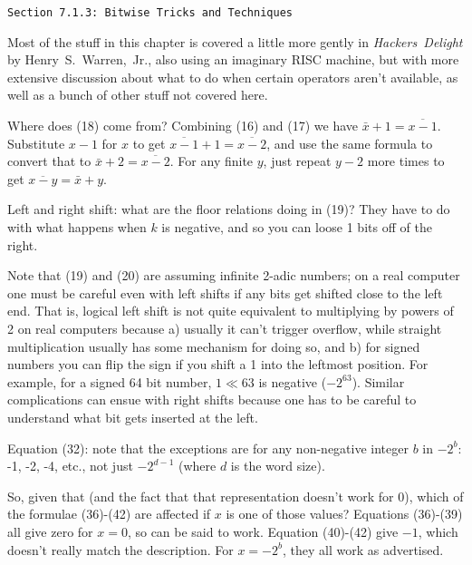 \vfil\break

\vskip 0.3in
\centerline{\tt Section 7.1.3: Bitwise Tricks and Techniques}
\vskip0.2in

Most of the stuff in this chapter is covered a little more gently
in {\it Hackers~Delight} by Henry~S.~Warren,~Jr., also using an imaginary RISC machine,
but with more extensive discussion about what to do when certain
operators aren't available, as well as a bunch of other stuff not
covered here.

\vskip 0.1in 

\noindent [p 135] Where does (18) come from? \hfil\break Combining (16) and
(17) we have $\bar x + 1 = \overline{x - 1}$.  Substitute $x-1$ for $x$
to get $\overline{x - 1} + 1 = \overline{x - 2}$, and use the same
formula to convert that to $\bar x + 2 = \overline{x - 2}$.  For any
finite $y$, just repeat $y-2$ more times to get $\overline{x - y} = \bar x + y$.

\vskip 0.08in \noindent [p 135] Left and right shift: what are the floor
relations doing in (19)?  \hfil\break They have to do with what happens when $k$
is negative, and so you can loose 1 bits off of the right.

Note that (19) and (20) are assuming infinite 2-adic numbers; on a real
computer one must be careful even with left shifts if any bits get shifted
close to the left end.  That is, logical left shift is not quite equivalent
to multiplying by powers of 2 on real computers because a) usually
it can't trigger overflow, while straight multiplication usually has
some mechanism for doing so, and b) for signed numbers you can
flip the sign if you shift a 1 into the leftmost position.  For example,
for a signed 64 bit number, $1 \ll 63$ is negative ($-2^{63}$).
Similar complications can ensue with right shifts because one has to
be careful to understand what bit gets inserted at the left.

\vskip 0.1in 

\noindent [p 140] Equation (32): note that the exceptions 
are for any non-negative integer $b$ in $-2^b$: -1, -2, -4, etc.,
not just $-2^{d-1}$ (where $d$ is the word size).

\vskip 0.08in \noindent [p 140] So, given that (and the fact that
that representation doesn't work for 0), which of the formulae
(36)-(42) are affected if $x$ is one of those values? Equations (36)-(39)
all give zero for $x=0$, so can be said to work.
Equation (40)-(42) give $-1$, which doesn't really
match the description.  For $x = -2^b$, they all work as advertised.

